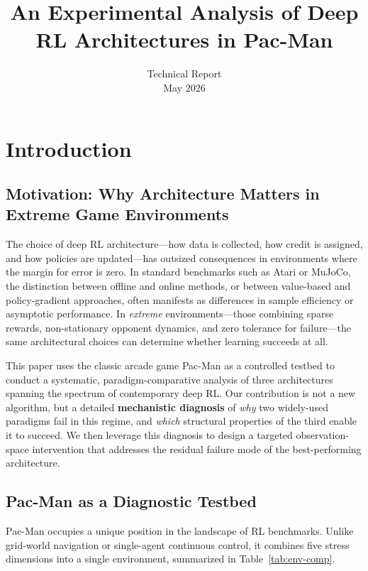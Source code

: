 \documentclass[11pt,a4paper]{article}
\title{\bfseries An Experimental Analysis of Deep RL Architectures in Pac-Man}
\author{
    \begin{tabular}{c}
        \small Technical Report \\
        \small May 2026
    \end{tabular}
}
\date{}
\theoremstyle{definition}
\begin{document}
\maketitle

\section{Introduction}

\subsection{Motivation: Why Architecture Matters in Extreme Game Environments}

The choice of deep RL architecture---how data is collected, how credit is assigned, and how policies are updated---has outsized consequences in environments where the margin for error is zero.
In standard benchmarks such as Atari or MuJoCo, the distinction between offline and online methods, or between value-based and policy-gradient approaches, often manifests as differences in sample efficiency or asymptotic performance.
In \textit{extreme} environments---those combining sparse rewards, non-stationary opponent dynamics, and zero tolerance for failure---the same architectural choices can determine whether learning succeeds at all.

This paper uses the classic arcade game Pac-Man as a controlled testbed to conduct a systematic, paradigm-comparative analysis of three architectures spanning the spectrum of contemporary deep RL.
Our contribution is not a new algorithm, but a detailed \textbf{mechanistic diagnosis} of \textit{why} two widely-used paradigms fail in this regime, and \textit{which} structural properties of the third enable it to succeed.
We then leverage this diagnosis to design a targeted observation-space intervention that addresses the residual failure mode of the best-performing architecture.

\subsection{Pac-Man as a Diagnostic Testbed}

Pac-Man occupies a unique position in the landscape of RL benchmarks.
Unlike grid-world navigation or single-agent continuous control, it combines five stress dimensions into a single environment, summarized in Table~\ref{tab:env-comp}.
\end{document}
